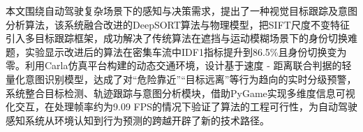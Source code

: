\begin{abstractzh}
	
本文围绕自动驾驶复杂场景下的感知与决策需求，提出了一种视觉目标跟踪及意图分析算法，该系统融合改进的DeepSORT算法与物理模型，把SIFT尺度不变特征引入多目标跟踪框架，成功解决了传统算法在遮挡与运动模糊场景下的身份切换难题，实验显示改进后的算法在密集车流中IDF1指标提升到86.5\%且身份切换变为零。利用Carla仿真平台构建的动态交通环境，设计基于速度 - 距离联合判据的轻量化意图识别模型，达成了对“危险靠近”“目标远离”等行为趋向的实时分级预警，系统整合目标检测、轨迹跟踪与意图分析模块，借助PyGame实现多维度信息可视化交互，在处理帧率约为9.09 FPS的情况下验证了算法的工程可行性，为自动驾驶感知系统从环境认知到行为预测的跨越开辟了新的技术路径。
	
	
\end{abstractzh}
